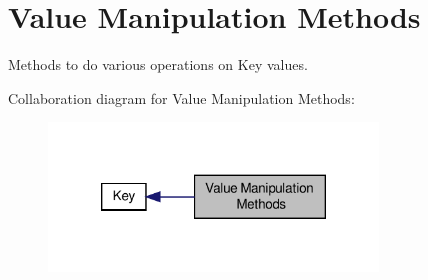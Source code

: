 \hypertarget{group__keyvalue}{\section{Value Manipulation Methods}
\label{group__keyvalue}
}


Methods to do various operations on Key values.  


Collaboration diagram for Value Manipulation Methods\-:\nopagebreak
\begin{figure}[H]
\begin{center}
\leavevmode
\includegraphics[width=248pt]{group__keyvalue}
\end{center}
\end{figure}
